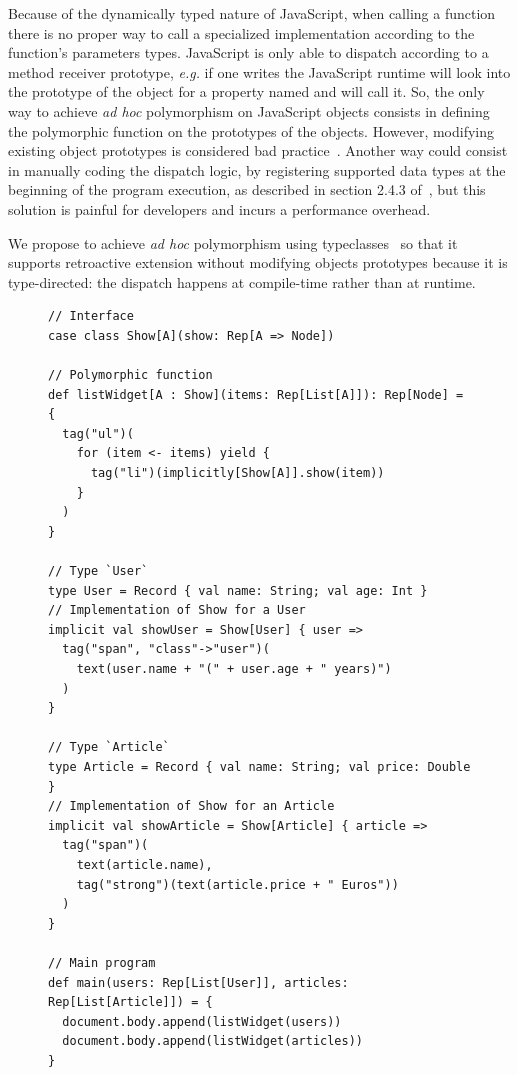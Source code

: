 \documentclass[american,english,runningheads]{llncs}
\newcommand{\eg}{\emph{e.g.}}
\begin{document}
Because of the dynamically typed nature of JavaScript, when calling a function there is no proper way to call a
specialized implementation according to the function’s parameters types. JavaScript is only able to dispatch
according to a method receiver prototype, \eg{} if one writes  the JavaScript runtime will look into
the prototype of the  object for a property named  and will call it. So, the only way to achieve
\emph{ad hoc} polymorphism on JavaScript objects consists in defining the polymorphic function on the prototypes of
the objects. However, modifying existing object prototypes is considered bad
practice~\cite{Zakas12_MaintainableJs}. Another way could consist in manually coding the dispatch logic, by
registering supported data types at the beginning of the program execution, as described in section 2.4.3
of~\cite{Abelson83_SICP}, but this solution is painful for developers and incurs a performance overhead.

We propose to achieve \emph{ad hoc} polymorphism using
typeclasses~\cite{Wadler89_AdhocPolymorphism,Odersky06_Typeclasses,Oliveira10_Typeclasses} so that it supports
retroactive extension without modifying objects prototypes because it is type-directed: the dispatch happens at
compile-time rather than at runtime.

\begin{figure}
\begin{lstlisting}[label=polymorphism,caption=Ad hoc polymorphism using typeclasses]
// Interface
case class Show[A](show: Rep[A => Node])

// Polymorphic function
def listWidget[A : Show](items: Rep[List[A]]): Rep[Node] = {
  tag("ul")(
    for (item <- items) yield {
      tag("li")(implicitly[Show[A]].show(item))
    }
  )
}

// Type `User`
type User = Record { val name: String; val age: Int }
// Implementation of Show for a User
implicit val showUser = Show[User] { user =>
  tag("span", "class"->"user")(
    text(user.name + "(" + user.age + " years)")
  )
}

// Type `Article`
type Article = Record { val name: String; val price: Double }
// Implementation of Show for an Article
implicit val showArticle = Show[Article] { article =>
  tag("span")(
    text(article.name),
    tag("strong")(text(article.price + " Euros"))
  )
}

// Main program
def main(users: Rep[List[User]], articles: Rep[List[Article]]) = {
  document.body.append(listWidget(users))
  document.body.append(listWidget(articles))
}
\end{lstlisting}
\end{figure}
\end{document}
